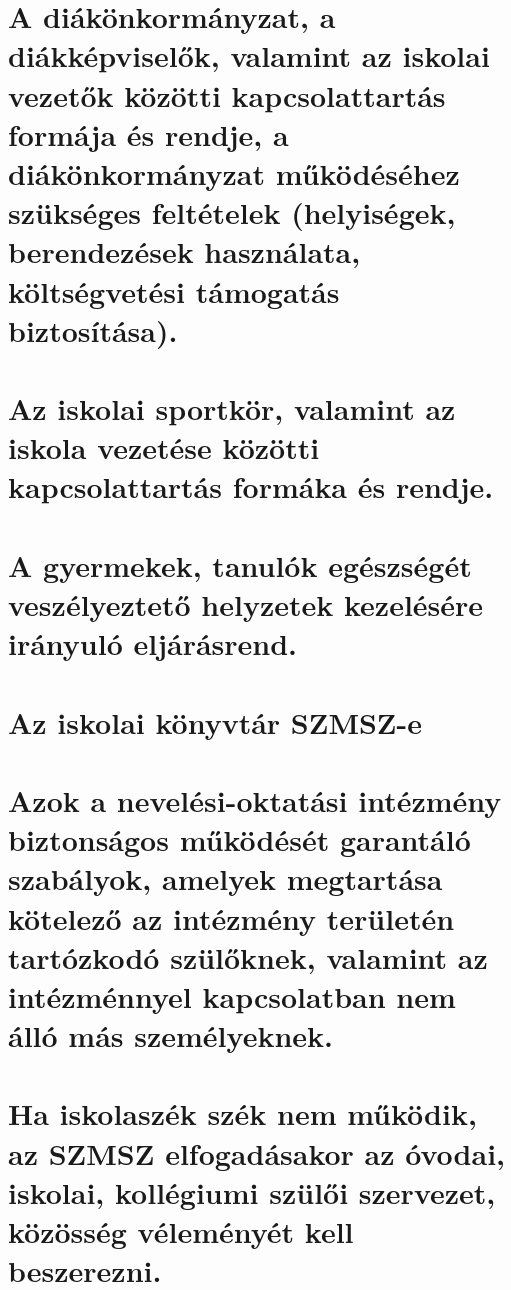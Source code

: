 \section{A diákönkormányzat, a diákképviselők, valamint az iskolai vezetők közötti kapcsolattartás formája és rendje, a diákönkormányzat működéséhez szükséges feltételek (helyiségek, berendezések használata, költségvetési támogatás biztosítása).}
\section{Az iskolai sportkör, valamint az iskola vezetése közötti kapcsolattartás formáka és rendje.}
\section{A gyermekek, tanulók egészségét veszélyeztető helyzetek kezelésére irányuló eljárásrend.}
\section{Az iskolai könyvtár SZMSZ-e}
\section{Azok a nevelési-oktatási intézmény biztonságos működését garantáló szabályok, amelyek megtartása kötelező az intézmény területén tartózkodó szülőknek, valamint az intézménnyel kapcsolatban nem álló más személyeknek.}
\section{Ha iskolaszék szék nem működik, az SZMSZ elfogadásakor az óvodai, iskolai, kollégiumi szülői szervezet, közösség véleményét kell beszerezni.}